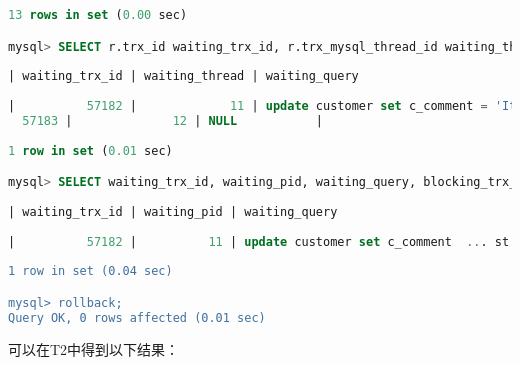 \documentclass{article}
\begin{document}
\begin{lstlisting}[language=sql]
13 rows in set (0.00 sec)

mysql> SELECT r.trx_id waiting_trx_id, r.trx_mysql_thread_id waiting_thread, r.trx_query waiting_query, b.trx_id blocking_trx_id, b.trx_mysql_thread_id blocking_thread, b.trx_query blocking_query FROM performance_schema.data_lock_waits w INNER JOIN information_schema.innodb_trx b ON b.trx_id = w.blocking_engine_transaction_id INNER JOIN information_schema.innodb_trx r ON r.trx_id = w.requesting_engine_transaction_id; -- T1
    
| waiting_trx_id | waiting_thread | waiting_query                                                             | blocking_trx_id | blocking_thread | blocking_query |
    
|          57182 |             11 | update customer set c_comment = 'It is a test.' where c_custkey = 1 -- T2 |
  57183 |              12 | NULL           |
    
1 row in set (0.01 sec)

mysql> SELECT waiting_trx_id, waiting_pid, waiting_query, blocking_trx_id, blocking_pid, blocking_query FROM sys.innodb_lock_waits; -- T1
    
| waiting_trx_id | waiting_pid | waiting_query                                                     | blocking_trx_id | blocking_pid | blocking_query |
    
|          57182 |          11 | update customer set c_comment  ... st.' where c_custkey = 1 -- T2 |           57183 |           12 | NULL           |
    
1 row in set (0.04 sec)

mysql> rollback;
Query OK, 0 rows affected (0.01 sec)
\end{lstlisting}

可以在T2中得到以下结果：
\end{document}
